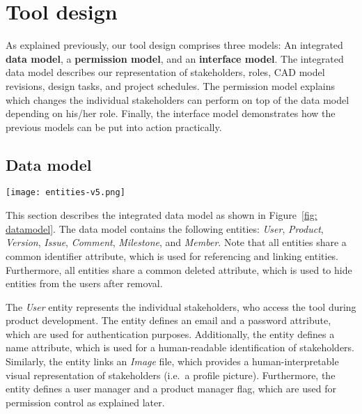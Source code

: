 \section{Tool design}
\label{sec:contribution}

As explained previously, our tool design comprises three models: An integrated \textbf{data model}, a \textbf{permission model}, and an \textbf{interface model}.
The integrated data model describes our representation of stakeholders, roles, CAD model revisions, design tasks, and project schedules.
The permission model explains which changes the individual stakeholders can perform on top of the data model depending on his/her role.
Finally, the interface model demonstrates how the previous models can be put into action practically.

\subsection{Data model}

\begin{figure*}[ht]
    \centering
    \texttt{[image: entities-v5.png]}
    \caption{Integrated data model for improved information exchange between customers, project managers, requirements engineers, and product designers}
    \label{fig: datamodel}
\end{figure*}

This section describes the integrated data model as shown in Figure~\ref{fig: datamodel}.
The data model contains the following entities: \textit{User}, \textit{Product}, \textit{Version}, \textit{Issue}, \textit{Comment}, \textit{Milestone}, and \textit{Member}.
Note that all entities share a common identifier attribute, which is used for referencing and linking entities.
Furthermore, all entities share a common deleted attribute, which is used to hide entities from the users after removal.

The \textit{User} entity represents the individual stakeholders, who access the tool during product development.
The entity defines an email and a password attribute, which are used for authentication purposes.
Additionally, the entity defines a name attribute, which is used for a human-readable identification of stakeholders.
Similarly, the entity links an \textit{Image} file, which provides a human-interpretable visual representation of stakeholders (i.e.\ a profile picture).
Furthermore, the entity defines a user manager and a product manager flag, which are used for permission control as explained later.

